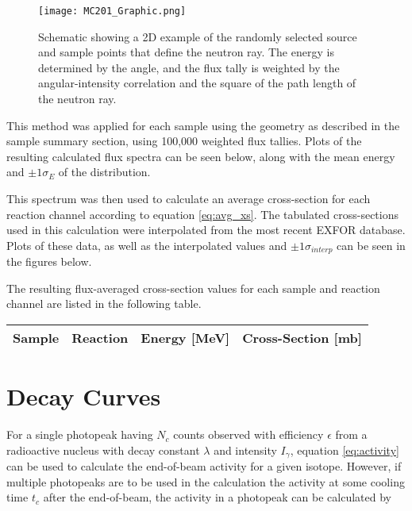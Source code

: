 \documentclass[aps,twocolumn,secnumarabic,balancelastpage,amsmath,amssymb,nofootinbib,floatfix]{revtex4-1}
\begin{document}
\begin{figure}[htb]
\texttt{[image: MC201\_Graphic.png]}
\caption{Schematic showing a 2D example of the randomly selected source and sample points that define the neutron ray.  The energy is determined by the angle, and the flux tally is weighted by the angular-intensity correlation and the square of the path length of the neutron ray.
}
\label{fig:MC_schematic}
\end{figure}

This method was applied for each sample using the geometry as described in the sample summary section, using 100,000 weighted flux tallies.  Plots of the resulting calculated flux spectra can be seen below, along with the mean energy and $\pm 1\sigma_E$ of the distribution.



This spectrum was then used to calculate an average cross-section for each reaction channel according to equation \ref{eq:avg_xs}.  The tabulated cross-sections used in this calculation were interpolated from the most recent EXFOR database.  Plots of these data, as well as the interpolated values and $\pm 1\sigma_{interp}$ can be seen in the figures below.



The resulting flux-averaged cross-section values for each sample and reaction channel are listed in the following table. \\

\begin{ruledtabular}
\begin{tabular}{cccc}
Sample & Reaction & Energy [MeV] & Cross-Section [mb] \\
\hline

\end{tabular}
\end{ruledtabular}


\section{Decay Curves}

For a single photopeak having $N_c$ counts observed with efficiency $\epsilon$ from a radioactive nucleus with decay constant $\lambda$ and intensity $I_{\gamma}$, equation \ref{eq:activity} can be used to calculate the end-of-beam activity for a given isotope.  However, if multiple photopeaks are to be used in the calculation the activity at some cooling time $t_c$ after the end-of-beam, the activity in a photopeak can be calculated by
\end{document}
